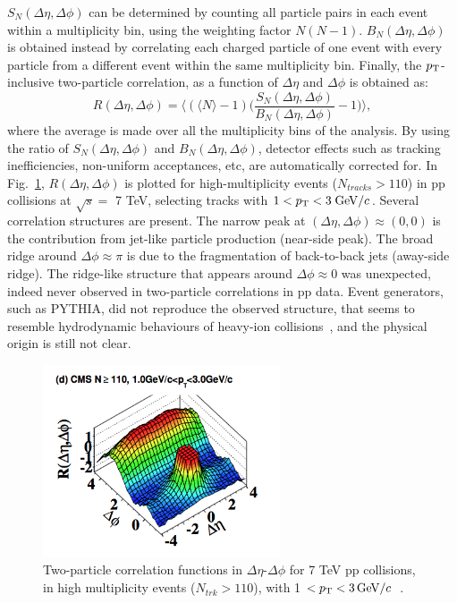 $S_N(\Delta \eta,\Delta \phi)$ can be determined by counting all particle pairs in each 
event within a multiplicity bin, using the weighting factor $N(N-1)$. $B_N(\Delta \eta,\Delta \phi)$ 
is obtained instead by correlating each charged particle of one event with every particle from 
a different event within the same multiplicity bin. Finally, the $p_{\rm T}$-inclusive two-particle 
correlation, as a function of $\Delta \eta$ and $\Delta \phi$ is obtained as:
\begin{equation}
\label{CorrelationFnc}
R(\Delta \eta,\Delta \phi) = \Big \langle (\langle N \rangle -1) \Big (\frac{S_N(\Delta \eta,\Delta \phi)}{B_N(\Delta \eta,\Delta \phi)} -1\Big )\Big \rangle,
\end{equation}
where the average is made over all the multiplicity bins of the analysis. 
\fi
By using the ratio of $S_N(\Delta \eta,\Delta \phi)$ and $B_N(\Delta \eta,\Delta \phi)$, 
detector effects such as tracking inefficiencies, non-uniform acceptances, etc, are 
automatically corrected for. In Fig.~\ref{fig:CMSLongRangeRidge_pp7TeV}, $R(\Delta \eta,\Delta \phi)$ 
is plotted for high-multiplicity events ($N_{tracks} > 110$) in pp collisions at $\sqrt{s} = $ 7 TeV, 
selecting tracks with $1 <p_{\rm T} < 3\; \mathrm{GeV}/c$. Several correlation structures are present. 
The narrow peak at $(\Delta \eta, \Delta \phi) \approx (0,0)$ is the contribution 
from jet-like particle production (near-side peak). The broad ridge around $\Delta \phi \approx \pi$ 
is due to the fragmentation of back-to-back jets (away-side ridge). The ridge-like 
structure that appears around $\Delta \phi \approx 0$ was unexpected,
 indeed never observed in two-particle correlations in pp data.
Event generators, such as PYTHIA, did not reproduce the 
 observed structure, that seems to resemble hydrodynamic behaviours of heavy-ion 
 collisions~\cite{Alver:2008aa,Alver:2009id,Abelev:2009jv}, and the physical origin is still not clear.
\begin{figure}[!ht]
  \centering
  \includegraphics[width=7cm]{FigCap1/CMSLongRangeRidge_pp7TeV.png}
  \caption{Two-particle correlation functions in $\Delta \eta$-$\Delta \phi$ for 7 TeV pp collisions, in high multiplicity events ($N_{trk}>110$), with 1 $< p_{\rm T} < 3 \,\mathrm{GeV}/c$~\cite{Khachatryan:2010gv}.}
  \label{fig:CMSLongRangeRidge_pp7TeV}
\end{figure}
